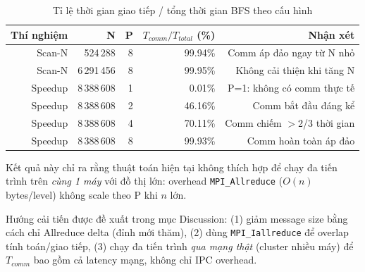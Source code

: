\begin{table}[h]
\centering
\caption{Tỉ lệ thời gian giao tiếp / tổng thời gian BFS theo cấu hình}
\label{tab:overhead}
\begin{tabular}{rrrrr}
\hline
\textbf{Thí nghiệm} & \textbf{N} & \textbf{P} &
\textbf{$T_{comm}/T_{total}$ (\%)} & \textbf{Nhận xét} \\
\hline
Scan-N & 524\,288     & 8 & 99.94\% & Comm áp đảo ngay từ N nhỏ \\
Scan-N & 6\,291\,456  & 8 & 99.95\% & Không cải thiện khi tăng N \\
Speedup & 8\,388\,608 & 1 &  0.01\% & P=1: không có comm thực tế \\
Speedup & 8\,388\,608 & 2 & 46.16\% & Comm bắt đầu đáng kể \\
Speedup & 8\,388\,608 & 4 & 70.11\% & Comm chiếm $>$2/3 thời gian \\
Speedup & 8\,388\,608 & 8 & 99.93\% & Comm hoàn toàn áp đảo \\
\hline
\end{tabular}
\begin{tablenotes}
\small
\item Kết quả này chỉ ra rằng thuật toán hiện tại không thích hợp để
      chạy đa tiến trình trên \emph{cùng 1 máy} với đồ thị lớn:
      overhead \texttt{MPI\_Allreduce} ($O(n)$ bytes/level)
      không scale theo P khi $n$ lớn.
\item Hướng cải tiến được đề xuất trong mục Discussion:
      (1) giảm message size bằng cách chỉ Allreduce delta (đỉnh mới thăm),
      (2) dùng \texttt{MPI\_Iallreduce} để overlap tính toán/giao tiếp,
      (3) chạy đa tiến trình \emph{qua mạng thật} (cluster nhiều máy) để
          $T_{comm}$ bao gồm cả latency mạng, không chỉ IPC overhead.
\end{tablenotes}
\end{table}